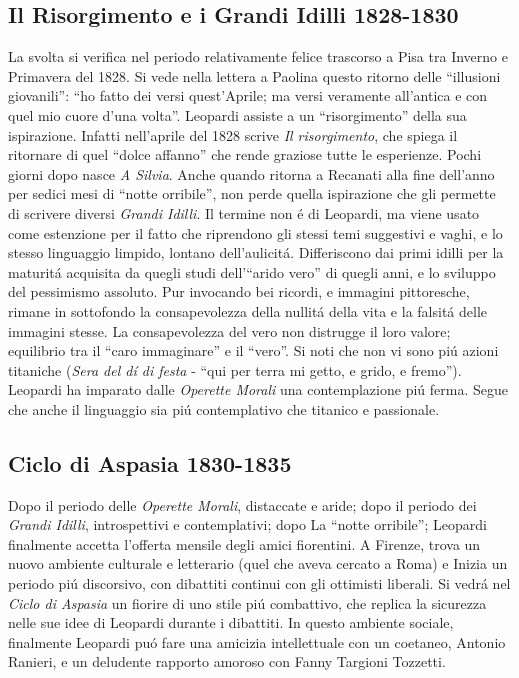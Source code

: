 \documentclass{report}
\begin{document}
\subsection*{Il Risorgimento e i Grandi Idilli 1828-1830}
La svolta si verifica nel periodo relativamente felice trascorso a Pisa tra Inverno e Primavera del 1828. Si vede nella lettera a Paolina questo ritorno delle ``illusioni giovanili'': ``ho fatto dei versi quest'Aprile; ma versi veramente all'antica e con quel mio cuore d'una volta''. Leopardi assiste a un ``risorgimento'' della sua ispirazione. Infatti nell'aprile del 1828 scrive \emph{Il risorgimento}, che spiega il ritornare di quel ``dolce affanno'' che rende graziose tutte le esperienze. Pochi giorni dopo nasce \emph{A Silvia}. Anche quando ritorna a Recanati alla fine dell'anno per sedici mesi di ``notte orribile'', non perde quella ispirazione che gli permette di scrivere diversi \emph{Grandi Idilli}. Il termine non é di Leopardi, ma viene usato come estenzione per il fatto che riprendono gli stessi temi suggestivi e vaghi, e lo stesso linguaggio limpido, lontano dell'aulicitá. Differiscono dai primi idilli per la maturitá acquisita da quegli studi dell'``arido vero'' di quegli anni, e lo sviluppo del pessimismo assoluto. Pur invocando bei ricordi, e immagini pittoresche, rimane in sottofondo la consapevolezza della nullitá della vita e la falsitá delle immagini stesse. La consapevolezza del vero non distrugge il loro valore; equilibrio tra il ``caro immaginare'' e il ``vero''. Si noti che non vi sono piú azioni titaniche (\emph{Sera del dí di festa} - ``qui per terra mi getto, e grido, e fremo''). Leopardi ha imparato dalle \emph{Operette Morali} una contemplazione piú ferma. Segue che anche il linguaggio sia piú contemplativo che titanico e passionale.
\subsection*{Ciclo di Aspasia 1830-1835}
Dopo il periodo delle \emph{Operette Morali}, distaccate e aride; dopo il periodo dei \emph{Grandi Idilli}, introspettivi e contemplativi; dopo La ``notte orribile''; Leopardi finalmente accetta l'offerta mensile degli amici fiorentini. A Firenze, trova un nuovo ambiente culturale e letterario (quel che aveva cercato a Roma) e Inizia un periodo piú discorsivo, con dibattiti continui con gli ottimisti liberali. Si vedrá nel \emph{Ciclo di Aspasia} un fiorire di uno stile piú combattivo, che replica la sicurezza nelle sue idee di Leopardi durante i dibattiti. In questo ambiente sociale, finalmente Leopardi puó fare una amicizia intellettuale con un coetaneo, Antonio Ranieri, e un deludente rapporto amoroso con Fanny Targioni Tozzetti.
\end{document}

